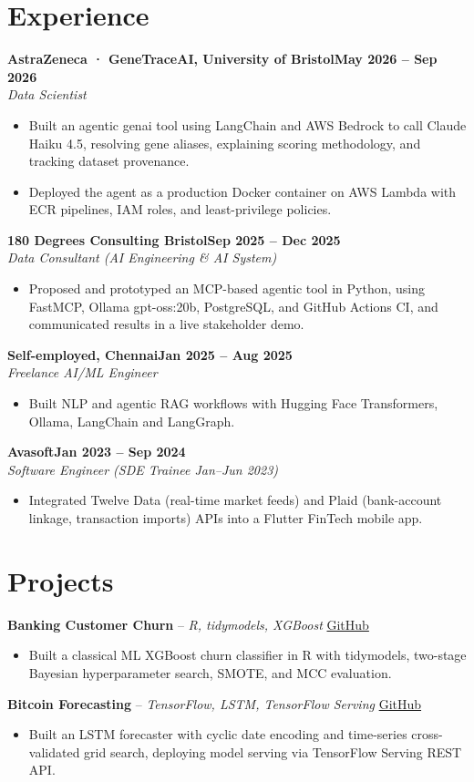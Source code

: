 \documentclass[a4paper,10pt]{article}
\newcommand{\entry}[4]{\noindent\textbf{#1}\hfill\textbf{#2}\\ \textit{#3}\hfill\textit{#4}\par}
\begin{document}
\section{Experience}
\entry{AstraZeneca · GeneTraceAI, University of Bristol}{May 2026 – Sep 2026}{Data Scientist}{}
\begin{itemize}
  \item Built an agentic genai tool using LangChain and AWS Bedrock to call Claude Haiku 4.5, resolving gene aliases, explaining scoring methodology, and tracking dataset provenance.
  \item Deployed the agent as a production Docker container on AWS Lambda with ECR pipelines, IAM roles, and least-privilege policies.
\end{itemize}
\vspace{3pt}
\entry{180 Degrees Consulting Bristol}{Sep 2025 – Dec 2025}{Data Consultant (AI Engineering \& AI System)}{}
\begin{itemize}
  \item Proposed and prototyped an MCP-based agentic tool in Python, using FastMCP, Ollama gpt-oss:20b, PostgreSQL, and GitHub Actions CI, and communicated results in a live stakeholder demo.
\end{itemize}
\vspace{3pt}
\entry{Self-employed, Chennai}{Jan 2025 – Aug 2025}{Freelance AI/ML Engineer}{}
\begin{itemize}
  \item Built NLP and agentic RAG workflows with Hugging Face Transformers, Ollama, LangChain and LangGraph.
\end{itemize}
\vspace{3pt}
\entry{Avasoft}{Jan 2023 – Sep 2024}{Software Engineer (SDE Trainee Jan–Jun 2023)}{}
\begin{itemize}
  \item Integrated Twelve Data (real-time market feeds) and Plaid (bank-account linkage, transaction imports) APIs into a Flutter FinTech mobile app.
\end{itemize}

\section{Projects}
\noindent\textbf{Banking Customer Churn} -- \textit{R, tidymodels, XGBoost} \hfill \href{https://github.com/Thiruvel-AP/Banking-Customer-Churn-Prediction}{GitHub}
\begin{itemize}
  \item Built a classical ML XGBoost churn classifier in R with tidymodels, two-stage Bayesian hyperparameter search, SMOTE, and MCC evaluation.
\end{itemize}
\noindent\textbf{Bitcoin Forecasting} -- \textit{TensorFlow, LSTM, TensorFlow Serving} \hfill \href{https://github.com/Thiruvel-AP/BitcoinForecasting}{GitHub}
\begin{itemize}
  \item Built an LSTM forecaster with cyclic date encoding and time-series cross-validated grid search, deploying model serving via TensorFlow Serving REST API.
\end{itemize}
\end{document}

